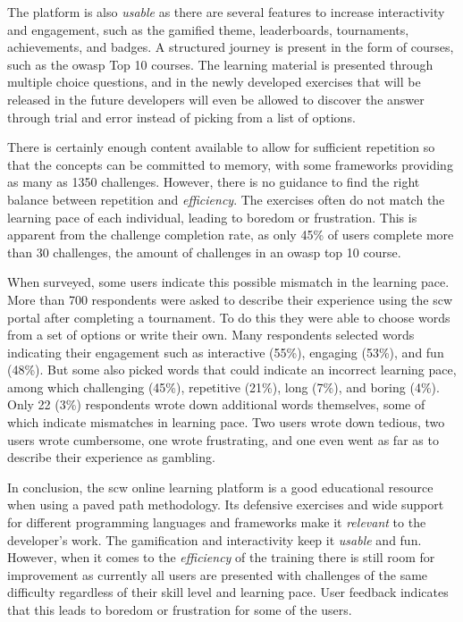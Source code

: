 The platform is also \textit{usable} as there are several features to increase interactivity and engagement, such as the gamified theme, leaderboards, tournaments, achievements, and badges.
A structured journey is present in the form of courses, such as the \gls{owasp} Top 10 courses.
The learning material is presented through multiple choice questions, and in the newly developed exercises that will be released in the future developers will even be allowed to discover the answer through trial and error instead of picking from a list of options.

There is certainly enough content available to allow for sufficient repetition so that the concepts can be committed to memory, with some frameworks providing as many as 1350 challenges.
However, there is no guidance to find the right balance between repetition and \textit{efficiency}.
The exercises often do not match the learning pace of each individual, leading to boredom or frustration.
This is apparent from the challenge completion rate, as only 45\% of users complete more than 30 challenges, the amount of challenges in an \gls{owasp} top 10 course.

When surveyed, some users indicate this possible mismatch in the learning pace.
More than 700 respondents were asked to describe their experience using the \gls{scw} portal after completing a tournament.
To do this they were able to choose words from a set of options or write their own.
Many respondents selected words indicating their engagement such as interactive (55\%), engaging (53\%), and fun (48\%).
But some also picked words that could indicate an incorrect learning pace, among which challenging (45\%), repetitive (21\%), long (7\%), and boring (4\%).
Only 22 (3\%) respondents wrote down additional words themselves, some of which indicate mismatches in learning pace. 
Two users wrote down tedious, two users wrote cumbersome, one wrote frustrating, and one even went as far as to describe their experience as gambling.

In conclusion, the \gls{scw} online learning platform is a good educational resource when using a paved path methodology. Its defensive exercises and wide support for different programming languages and frameworks make it \textit{relevant} to the developer's work. The gamification and interactivity keep it \textit{usable} and fun. However, when it comes to the \textit{efficiency} of the training there is still room for improvement as currently all users are presented with challenges of the same difficulty regardless of their skill level and learning pace. User feedback indicates that this leads to boredom or frustration for some of the users. 